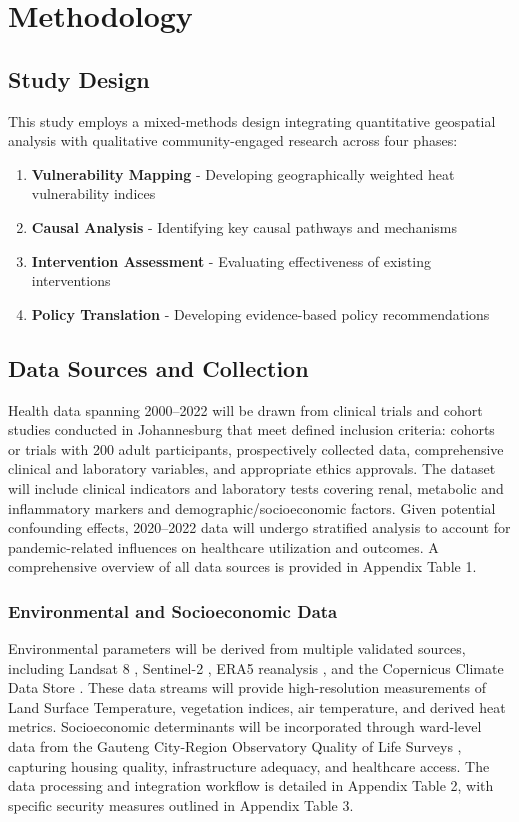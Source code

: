 \section{Methodology}

\subsection{Study Design}
This study employs a mixed-methods design integrating quantitative geospatial analysis with qualitative community-engaged research across four phases:
\begin{enumerate}
    \item \textbf{Vulnerability Mapping} - Developing geographically weighted heat vulnerability indices
    \item \textbf{Causal Analysis} - Identifying key causal pathways and mechanisms
    \item \textbf{Intervention Assessment} - Evaluating effectiveness of existing interventions
    \item \textbf{Policy Translation} - Developing evidence-based policy recommendations
\end{enumerate}

\subsection{Data Sources and Collection}
Health data spanning 2000--2022 will be drawn from clinical trials and cohort studies conducted in Johannesburg that meet defined inclusion criteria: cohorts or trials with 200 adult participants, prospectively collected data, comprehensive clinical and laboratory variables, and appropriate ethics approvals. The dataset will include clinical indicators and laboratory tests covering renal, metabolic and inflammatory markers and demographic/socioeconomic factors. Given potential confounding effects, 2020--2022 data will undergo stratified analysis to account for pandemic-related influences on healthcare utilization and outcomes. A comprehensive overview of all data sources is provided in Appendix Table 1.

\subsubsection{Environmental and Socioeconomic Data}
Environmental parameters will be derived from multiple validated sources, including Landsat 8 \citep{landsat8}, Sentinel-2 \citep{sentinel2}, ERA5 reanalysis \citep{era5}, and the Copernicus Climate Data Store \citep{copernicus_climate_data_store}. These data streams will provide high-resolution measurements of Land Surface Temperature, vegetation indices, air temperature, and derived heat metrics. Socioeconomic determinants will be incorporated through ward-level data from the Gauteng City-Region Observatory Quality of Life Surveys \citep{gcro_qol_survey}, capturing housing quality, infrastructure adequacy, and healthcare access. The data processing and integration workflow is detailed in Appendix Table 2, with specific security measures outlined in Appendix Table 3.

